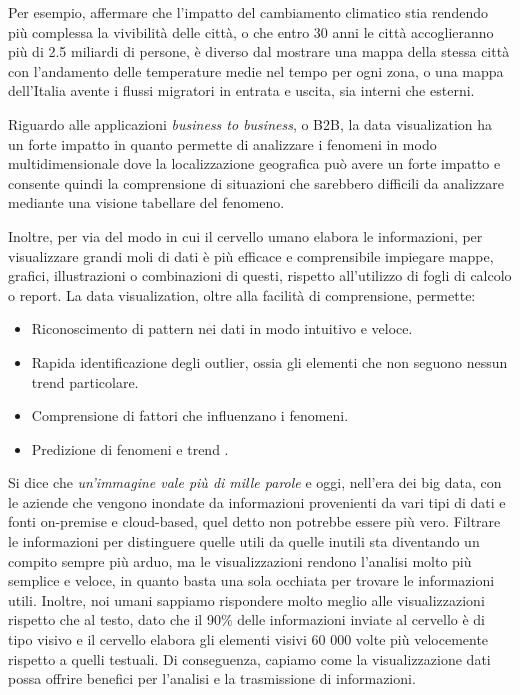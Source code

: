 Per esempio, affermare che l'impatto del cambiamento climatico stia rendendo più complessa la vivibilità delle città, o che entro 30 anni le città accoglieranno più di 2.5 miliardi di persone, è diverso dal mostrare una mappa della stessa città con l'andamento delle temperature medie nel tempo per ogni zona, o una mappa dell'Italia avente i flussi migratori in entrata e uscita, sia interni che esterni.

Riguardo alle applicazioni \textit{business to business}, o B2B, la data visualization ha un forte impatto in quanto permette di analizzare i fenomeni in modo multidimensionale dove la localizzazione geografica può avere un forte impatto e consente quindi la comprensione di situazioni che sarebbero difficili da analizzare mediante una visione tabellare del fenomeno.

Inoltre, per via del modo in cui il cervello umano elabora le informazioni, per visualizzare grandi moli di dati è più efficace e comprensibile impiegare mappe, grafici, illustrazioni o combinazioni di questi, rispetto all'utilizzo di fogli di calcolo o report.
La data visualization, oltre alla facilità di comprensione, permette:
\begin{itemize}
    \item Riconoscimento di pattern nei dati in modo intuitivo e veloce.
    \item Rapida identificazione degli outlier, ossia gli elementi che non seguono nessun trend particolare.
    \item Comprensione di fattori che influenzano i fenomeni.
    \item Predizione di fenomeni e trend \cite{DataVisualization_Citta}.
\end{itemize}



Si dice che \textit{un'immagine vale più di mille parole} e oggi, nell'era dei big data, con le aziende che vengono inondate da informazioni provenienti da vari tipi di dati e fonti on-premise e cloud-based, quel detto non potrebbe essere più vero. Filtrare le informazioni per distinguere quelle utili da quelle inutili sta diventando un compito sempre più arduo, ma le visualizzazioni rendono l'analisi molto più semplice e veloce, in quanto basta una sola occhiata per trovare le informazioni utili. Inoltre, noi umani sappiamo rispondere molto meglio alle visualizzazioni rispetto che al testo, dato che il 90\% delle informazioni inviate al cervello è di tipo visivo e il cervello elabora gli elementi visivi 60 000 volte più velocemente rispetto a quelli testuali. Di conseguenza, capiamo come la visualizzazione dati possa offrire benefici per l'analisi e la trasmissione di informazioni.

